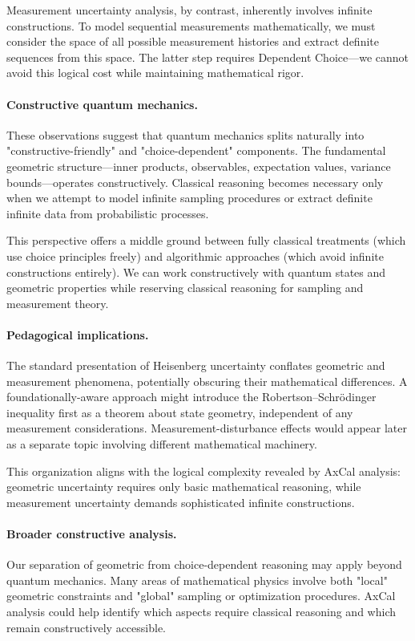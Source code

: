 \documentclass[11pt]{article}
\theoremstyle{plain}
\theoremstyle{definition}
\theoremstyle{remark}
\begin{document}
Measurement uncertainty analysis, by contrast, inherently involves infinite constructions. To model sequential measurements mathematically, we must consider the space of all possible measurement histories and extract definite sequences from this space. The latter step requires Dependent Choice---we cannot avoid this logical cost while maintaining mathematical rigor.

\paragraph{Constructive quantum mechanics.}
These observations suggest that quantum mechanics splits naturally into "constructive-friendly" and "choice-dependent" components. The fundamental geometric structure---inner products, observables, expectation values, variance bounds---operates constructively. Classical reasoning becomes necessary only when we attempt to model infinite sampling procedures or extract definite infinite data from probabilistic processes.

This perspective offers a middle ground between fully classical treatments (which use choice principles freely) and algorithmic approaches (which avoid infinite constructions entirely). We can work constructively with quantum states and geometric properties while reserving classical reasoning for sampling and measurement theory.

\paragraph{Pedagogical implications.}
The standard presentation of Heisenberg uncertainty conflates geometric and measurement phenomena, potentially obscuring their mathematical differences. A foundationally-aware approach might introduce the Robertson--Schrödinger inequality first as a theorem about state geometry, independent of any measurement considerations. Measurement-disturbance effects would appear later as a separate topic involving different mathematical machinery.

This organization aligns with the logical complexity revealed by AxCal analysis: geometric uncertainty requires only basic mathematical reasoning, while measurement uncertainty demands sophisticated infinite constructions.

\paragraph{Broader constructive analysis.}
Our separation of geometric from choice-dependent reasoning may apply beyond quantum mechanics. Many areas of mathematical physics involve both "local" geometric constraints and "global" sampling or optimization procedures. AxCal analysis could help identify which aspects require classical reasoning and which remain constructively accessible.
\end{document}
